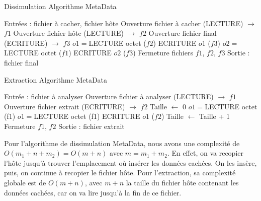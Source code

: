 \documentclass[11pt]{article}
\begin{document}
\begin{minipage}{.5\textwidth}
\begin{algorithm}[H]
\caption{Dissimulation Algorithme MetaData}
\begin{algorithmic}
\color{green}
\STATE \footnotesize Entrées : fichier à cacher, fichier hôte
\color{black}
\STATE Ouverture fichier à cacher (LECTURE) $\rightarrow$ $f1$
\STATE Ouverture fichier hôte (LECTURE) $\rightarrow$ $f2$
\STATE Ouverture fichier final (ECRITURE) $\rightarrow$ $f3$
\STATE $o1 = $LECTURE octet ($f2$)
\STATE ECRITURE $o1$ ($f3$)
\STATE $o2 = $LECTURE octet ($f1$)
\STATE ECRITURE $o2$  ($f3$)
\ENDWHILE
\ENDIF
\ENDWHILE
\STATE Fermeture fichiers $f1$, $f2$, $f3$
\color{green}
\STATE Sortie : fichier final
\color{black}
\end{algorithmic}
\end{algorithm}
\normalsize
\end{minipage}
\begin{minipage}{.5\textwidth}
\begin{algorithm}[H]
\caption{Extraction Algorithme MetaData}
\begin{algorithmic}
\color{green}
\STATE \footnotesize Entrée : fichier à analyser
\color{black}
\STATE Ouverture fichier à analyser (LECTURE) $\rightarrow$ $f1$
\STATE Ouverture fichier extrait (ECRITURE) $\rightarrow$ $f2$
\STATE Taille $\leftarrow$ 0
\STATE $o1 = $LECTURE octet (f1)
\STATE $o1 = $LECTURE octet (f1)
\STATE ECRITURE $o1$ ($f2$)
\STATE Taille $\leftarrow$ Taille + 1
\ENDWHILE
\ENDIF
\ENDWHILE
\STATE Fermeture $f1$, $f2$
\color{green}
\STATE Sortie : fichier extrait
\color{black}
\end{algorithmic}
\end{algorithm}
\normalsize
\end{minipage}

Pour l'algorithme de dissimulation MetaData, nous avons une complexité de 
$O(m_1+n+m_2)=O(m+n)$ avec $m=m_1+m_2$. En effet, on va recopier l'hôte 
jusqu'à trouver l'emplacement où insérer les données cachées. On les insère, puis, on 
continue à recopier le fichier hôte. \newline
Pour l'extraction, sa complexité globale est de $O(m+n)$, avec $m+n$ la taille 
du fichier hôte contenant les données cachées, car on va lire jusqu'à 
la fin de ce fichier. 
\end{document}
